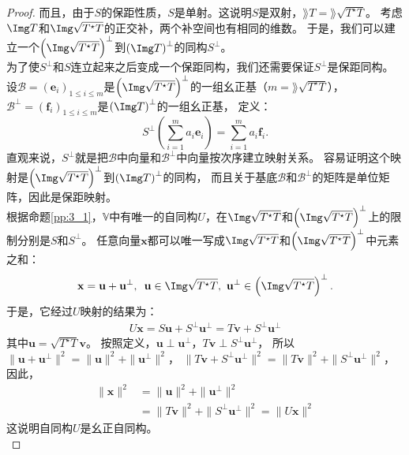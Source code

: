 \documentclass[12pt,UTF8,fontset=none]{ctexbook}
\begin{document}
\begin{proof}
    而且，由于$S$的保距性质，$S$是单射。这说明$S$是双射，$\rang T = \rang \sqrt{T^\star T}$。
    考虑$\Img T$和$\Img \sqrt{T^\star T}$的正交补，两个补空间也有相同的维数。
    于是，我们可以建立一个$\left(\Img \sqrt{T^\star T}\right)^\perp$到$\left(\Img T\right)^\perp$的同构$S^\perp$。\\
    为了使$S^\perp$和$S$连立起来之后变成一个保距同构，我们还需要保证$S^\perp$是保距同构。
    设$\mathcal{B} = (\mathbf{e}_i)_{1 \leqslant i \leqslant m}$是$\left(\Img \sqrt{T^\star T}\right)^\perp$的一组幺正基（$m = \rang \sqrt{T^\star T}$），
    $\mathcal{B}^\perp = (\mathbf{f}_i)_{1 \leqslant i \leqslant m}$是$\left(\Img T\right)^\perp$的一组幺正基，
    定义：
    $$ S^\perp(\sum_{i=1}^m a_i \mathbf{e}_i) = \sum_{i=1}^m a_i \mathbf{f}_i. $$
    直观来说，$S^\perp$就是把$\mathcal{B}$中向量和$\mathcal{B}^\perp$中向量按次序建立映射关系。
    容易证明这个映射是$\left(\Img \sqrt{T^\star T}\right)^\perp$到$\left(\Img T\right)^\perp$的同构，
    而且关于基底$\mathcal{B}$和$\mathcal{B}^\perp$的矩阵是单位矩阵，因此是保距映射。\\
    根据命题\ref{pp:3_1}，$\mathbb{V}$中有唯一的自同构$U$，在$\Img \sqrt{T^\star T}$和$\left(\Img \sqrt{T^\star T}\right)^\perp$上的限制分别是$S$和$S^\perp$。
    任意向量$\mathbf{x}$都可以唯一写成$\Img \sqrt{T^\star T}$和$\left(\Img \sqrt{T^\star T}\right)^\perp$中元素之和：
    $$ \mathbf{x} = \mathbf{u} + \mathbf{u}^\perp, \,\,\, \mathbf{u} \in \Img \sqrt{T^\star T} , \,\, \mathbf{u}^\perp \in \left(\Img \sqrt{T^\star T}\right)^\perp. $$
    于是，它经过$U$映射的结果为：
    \begin{align*}
        U\mathbf{x} = S\mathbf{u} + S^\perp\mathbf{u}^\perp = T\mathbf{v} + S^\perp\mathbf{u}^\perp 
    \end{align*}
    其中$\mathbf{u} = \sqrt{T^\star T} \mathbf{v}$。
    按照定义，$\mathbf{u} \perp \mathbf{u}^\perp$，$T\mathbf{v} \perp S^\perp\mathbf{u}^\perp$，
    所以$\| \mathbf{u} + \mathbf{u}^\perp \|^2 = \| \mathbf{u} \|^2 + \| \mathbf{u}^\perp \|^2$，
    $\| T\mathbf{v} + S^\perp\mathbf{u}^\perp \|^2 = \| T\mathbf{v} \|^2 + \| S^\perp\mathbf{u}^\perp \|^2$，
    因此，
    \begin{align*}
        \| \mathbf{x} \|^2 &= \| \mathbf{u} \|^2 + \| \mathbf{u}^\perp \|^2  \\
        &= \| T\mathbf{v} \|^2 + \| S^\perp\mathbf{u}^\perp \|^2 = \| U\mathbf{x} \|^2  
    \end{align*}
    这说明自同构$U$是幺正自同构。\\
\end{proof}
\end{document}
